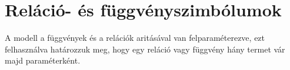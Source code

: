 \section{Reláció- és függvényszimbólumok}

A modell a függvények és a relációk aritásával van felparaméterezve, ezt felhasználva határozzuk meg, hogy egy reláció vagy függvény hány termet vár majd paraméterként.
\begin{code}%
%
\>[6]%
\>[12]\AgdaSymbol{:}\AgdaSpace{}%
\AgdaSymbol{\}\{}\AgdaSpace{}%
\AgdaSymbol{:}\AgdaSpace{}%
\AgdaSymbol{\}}\AgdaSpace{}%
\AgdaSpace{}%
\AgdaSpace{}%
\AgdaSpace{}%
\AgdaSpace{}%
\AgdaSpace{}%
\AgdaSpace{}%
\AgdaOperator{\AgdaFunction{\textasciicircum{}}}\AgdaSpace{}%
\AgdaSpace{}%
\AgdaSpace{}%
\AgdaSpace{}%
\<%
\\
%
\>[6]\AgdaSpace{}%
\AgdaSymbol{:}%
\>[473I]\AgdaSpace{}%
\AgdaSymbol{\}\{}\AgdaSpace{}%
\AgdaSymbol{:}\AgdaSpace{}%
\AgdaSpace{}%
\AgdaSymbol{\}\{}\AgdaSpace{}%
\AgdaSymbol{:}\AgdaSpace{}%
\AgdaSpace{}%
\AgdaSpace{}%
\AgdaOperator{\AgdaFunction{\textasciicircum{}}}\AgdaSpace{}%
\AgdaSymbol{\}\{}\AgdaSymbol{\}\{}\AgdaSpace{}%
\AgdaSymbol{:}\AgdaSpace{}%
\AgdaSpace{}%
\AgdaSpace{}%
\AgdaSymbol{\}}\<%
\\
\>[.][@{}l@{}]\<[473I]%
\>[14]\AgdaSpace{}%
\AgdaSpace{}%
\AgdaSpace{}%
\AgdaSpace{}%
\AgdaOperator{\AgdaField{[}}\AgdaSpace{}%
\AgdaSpace{}%
\AgdaOperator{\AgdaField{]ᶠ}}\AgdaSpace{}%
\AgdaSpace{}%
\AgdaSpace{}%
\AgdaSpace{}%
\AgdaSymbol{(}\AgdaSpace{}%
\AgdaOperator{\AgdaField{\AgdaUnderscore{}[}}\AgdaSpace{}%
\AgdaSpace{}%
\AgdaOperator{\AgdaField{]ᵗ}}\AgdaSpace{}%
\AgdaSymbol{)}\<%
\\
%
\>[6]%
\>[12]\AgdaSymbol{:}\AgdaSpace{}%
\AgdaSymbol{\}\{}\AgdaSpace{}%
\AgdaSymbol{:}\AgdaSpace{}%
\AgdaSymbol{\}}\AgdaSpace{}%
\AgdaSpace{}%
\AgdaSpace{}%
\AgdaSpace{}%

\end{code}
